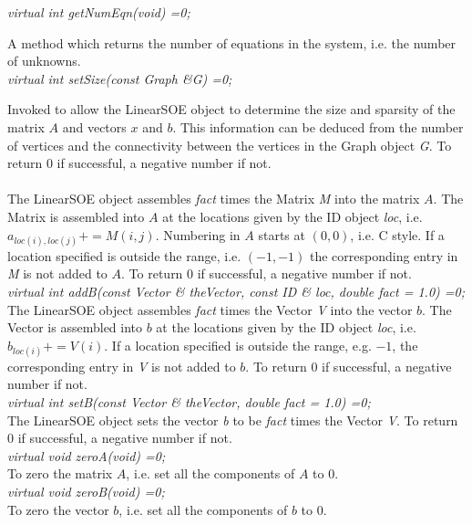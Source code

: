 {\em virtual int getNumEqn(void) =0; } 

A method which returns the number of equations in the system, i.e. the number
of unknowns. \\  

{\em virtual int setSize(const Graph \&G) =0; } 

Invoked to allow the LinearSOE object to determine the size and sparsity of 
the matrix $A$ and vectors $x$ and $b$. This information can be
deduced from the number of vertices and the connectivity between the
vertices in the Graph object {\em G}. To return $0$ if
successful, a negative number if not. \\  

 \\
The LinearSOE object assembles {\em fact} times the Matrix {\em
M} into the matrix $A$. The Matrix is assembled into $A$ at the
locations given by the ID object {\em loc}, i.e. $a_{loc(i),loc(j)} +=
M(i,j)$. Numbering in $A$ starts at $(0,0)$, i.e. C style. If a
location specified is outside the range, i.e. $(-1,-1)$ the
corresponding entry in {\em M} is not added to $A$. To return $0$ if
successful, a negative number if not. \\ 

{\em virtual int addB(const Vector \& theVector, const ID \& loc,
double fact = 1.0) =0;} \\
The LinearSOE object assembles {\em fact} times the Vector {\em V} into
the vector $b$. The Vector is assembled into $b$ at the locations
given by the ID object {\em loc}, i.e. $b_{loc(i)} += V(i)$. If a
location specified is outside the range, e.g. $-1$, the corresponding
entry in {\em V} is not added to $b$. To return $0$ if successful, a
negative number if not.  \\ 

{\em virtual int setB(const Vector \& theVector,
double fact = 1.0) =0;} \\
The LinearSOE object sets the vector {\em b} to be {\em fact} times
the Vector {\em V}. To return $0$ if successful, a negative number if
not.  \\  

{\em virtual void zeroA(void) =0;} \\
To zero the matrix $A$, i.e. set all the components of $A$ to $0$. \\

{\em virtual void zeroB(void) =0;} \\
To zero the vector $b$, i.e. set all the components of $b$ to $0$. \\

